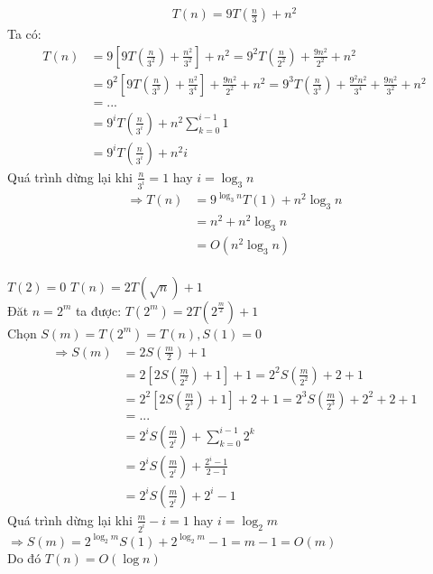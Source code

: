 \documentclass[12pt, a4paper, fleqn]{article}
\begin{document}
\begin{align*}
T(n) = 9T\left(\frac{n}{3}\right) + n ^ 2
\end{align*}
Ta có:
\begin{align*}
T(n) &= 9\left[9T\left(\frac{n}{3^2}\right)+\frac{n^2}{3^2}\right]+n^2=9^2T\left(\frac{n}{2^2}\right)+\frac{9n^2}{2^2}+n^2\\
&=9^2\left[9T\left(\frac{n}{3^3}\right)+\frac{n^2}{3^4}\right]+\frac{9n^2}{2^2}+n^2=9^3T\left(\frac{n}{3^3}\right)+\frac{9^2n^2}{3^4}+\frac{9n^2}{3^2}+n^2\\
&=...\\
&=9^iT\left(\frac{n}{3^i}\right)+n^2{\sum_{k=0}^{i-1}1}\\
&=9^iT\left(\frac{n}{3^i}\right)+n^2i
\end{align*}
Quá trình dừng lại khi $\displaystyle \frac{n}{3 ^ i} = 1$ hay $i = \log_{3}{n}$
\setlength{\abovedisplayskip}{3pt}%
\setlength{\belowdisplayskip}{3pt}%
\begin{align*}
\Rightarrow T(n) &= 9^{\log_{3}{n}}T(1)+n^2\log_{3}{n}\\
&= n^2+n^2\log_{3}{n}\\
&= O\left(n^2\log_{3}{n}\right)
\end{align*}
\\
$T(2) = 0$ \qquad\qquad\qquad $T(n) = 2T\left(\sqrt{n}\right) + 1$\\
Đăt $n = 2 ^ m$ ta được:
$\displaystyle T(2 ^ m) = 2T\left(2 ^ {\displaystyle \frac{m}{2}}\right) + 1$\\
Chọn $S(m) = T(2 ^ m) = T(n), S(1) = 0$
\begin{align*}
\Rightarrow S(m) &= 2S\left(\frac{m}{2}\right) + 1\\
                 &= 2\left[2S\left(\frac{m}{2 ^ 2}\right) + 1\right] + 1 = 2 ^ 2S\left(\frac{m}{2 ^ 2}\right) + 2 + 1\\
				 &= 2 ^ 2\left[2S\left(\frac{m}{2 ^ 3}\right) + 1\right] + 2 + 1 = 2 ^ 3S\left(\frac{m}{2 ^ 3}\right) + 2 ^ 2 + 2 + 1\\
				 &= ...\\
				 &= 2 ^ iS\left(\frac{m}{2 ^ i}\right) + \sum_{k = 0}^ {i - 1}2 ^ k\\
				 &= 2 ^ iS\left(\frac{m}{2 ^ i}\right) + \frac{2 ^ i - 1}{2 - 1}\\
				 &= 2 ^ iS\left(\frac{m}{2 ^ i}\right) + 2 ^ i - 1
\end{align*}
Quá trình dừng lại khi $\displaystyle \frac{m}{2 ^ i}-i = 1$ hay $i = \log_{2}{m}$\\
$\Rightarrow S(m) = 2 ^ {\log_{2}{m}}S(1) + 2 ^ {\log_{2}{m}}-1 = m - 1 = O(m)$\\
Do đó $T(n) = O(\log{n})$
\end{document}
